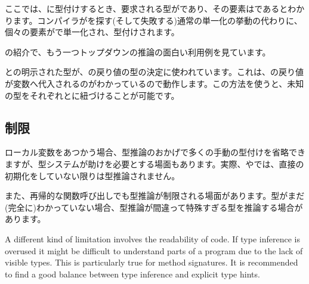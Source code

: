 
ここでは、\expr{[1, "foo"]}に型付けするとき、要求される型がであり、その要素はであるとわかります。コンパイラがを探す(そして失敗する)通常の単一化の挙動の代わりに、個々の要素がで単一化され、型付けされます。

の紹介で、もう一つトップダウンの推論の面白い利用例を見ています。


との明示された型が、の戻り値の型の決定に使われています。これは、の戻り値が変数へ代入されるのがわかっているので動作します。この方法を使うと、未知の型をそれぞれとに紐づけることが可能です。





\subsection{制限}
\label{type-system-inference-limitations}

ローカル変数をあつかう場合、型推論のおかげで多くの手動の型付けを省略できますが、型システムが助けを必要とする場面もあります。実際、やでは、直接の初期化をしていない限りは型推論されません。

また、再帰的な関数呼び出しでも型推論が制限される場面があります。型がまだ(完全に)わかっていない場合、型推論が間違って特殊すぎる型を推論する場合があります。

A different kind of limitation involves the readability of code. If type inference is overused it might be difficult to understand parts of a program due to the lack of visible types. This is particularly true for method signatures. It is recommended to find a good balance between type inference and explicit type hints.


